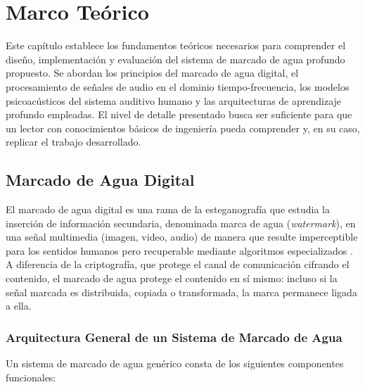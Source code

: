\section{Marco Teórico}
\label{ch:marco_teorico}

Este capítulo establece los fundamentos teóricos necesarios para comprender el diseño, implementación y evaluación del sistema de marcado de agua profundo propuesto. Se abordan los principios del marcado de agua digital, el procesamiento de señales de audio en el dominio tiempo-frecuencia, los modelos psicoacústicos del sistema auditivo humano y las arquitecturas de aprendizaje profundo empleadas. El nivel de detalle presentado busca ser suficiente para que un lector con conocimientos básicos de ingeniería pueda comprender y, en su caso, replicar el trabajo desarrollado.

\subsection{Marcado de Agua Digital}
\label{sec:fundamentos_watermarking}

El marcado de agua digital es una rama de la esteganografía que estudia la inserción de información secundaria, denominada marca de agua (\textit{watermark}), en una señal multimedia (imagen, video, audio) de manera que resulte imperceptible para los sentidos humanos pero recuperable mediante algoritmos especializados \cite{cox2007digital}. A diferencia de la criptografía, que protege el canal de comunicación cifrando el contenido, el marcado de agua protege el contenido en sí mismo: incluso si la señal marcada es distribuida, copiada o transformada, la marca permanece ligada a ella.

\subsubsection{Arquitectura General de un Sistema de Marcado de Agua}

Un sistema de marcado de agua genérico consta de los siguientes componentes funcionales:

